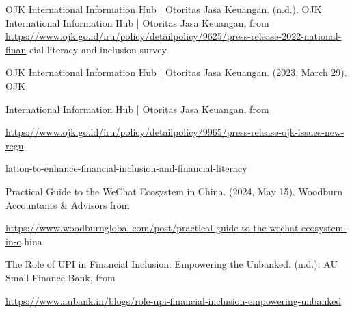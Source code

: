 \documentclass[10pt]{article}
\begin{document}
OJK International Information Hub $\mid$ Otoritas Jasa Keuangan. (n.d.). OJK International Information Hub | Otoritas Jasa Keuangan, from\\
\href{https://www.ojk.go.id/iru/policy/detailpolicy/9625/press-release-2022-national-finan}{https://www.ojk.go.id/iru/policy/detailpolicy/9625/press-release-2022-national-finan} cial-literacy-and-inclusion-survey

OJK International Information Hub | Otoritas Jasa Keuangan. (2023, March 29). OJK

International Information Hub | Otoritas Jasa Keuangan, from

\href{https://www.ojk.go.id/iru/policy/detailpolicy/9965/press-release-ojk-issues-new-regu}{https://www.ojk.go.id/iru/policy/detailpolicy/9965/press-release-ojk-issues-new-regu}

lation-to-enhance-financial-inclusion-and-financial-literacy

Practical Guide to the WeChat Ecosystem in China. (2024, May 15). Woodburn Accountants \& Advisors from

\href{https://www.woodburnglobal.com/post/practical-guide-to-the-wechat-ecosystem-in-c}{https://www.woodburnglobal.com/post/practical-guide-to-the-wechat-ecosystem-in-c} hina

The Role of UPI in Financial Inclusion: Empowering the Unbanked. (n.d.). AU Small Finance Bank, from

\href{https://www.aubank.in/blogs/role-upi-financial-inclusion-empowering-unbanked}{https://www.aubank.in/blogs/role-upi-financial-inclusion-empowering-unbanked}
\end{document}
